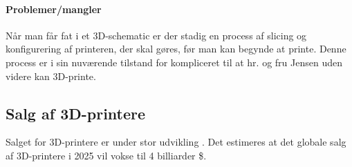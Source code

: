 \paragraph{Problemer/mangler} %
\label{par:problemer_mangler}

Når man får fat i et 3D-schematic er der stadig en process af slicing og konfigurering af printeren, der skal gøres, før man kan begynde at printe. Denne process er i sin nuværende tilstand for kompliceret til at hr. og fru Jensen uden videre kan 3D-printe.


\subsection{Salg af 3D-printere}

Salget for 3D-printere er under stor udvikling \autocite{wohler_sales_2012}. Det estimeres at det globale salg af 3D-printere i 2025 vil vokse til 4 billiarder \$. \autocite[110]{manyika_disruptive_2013}









